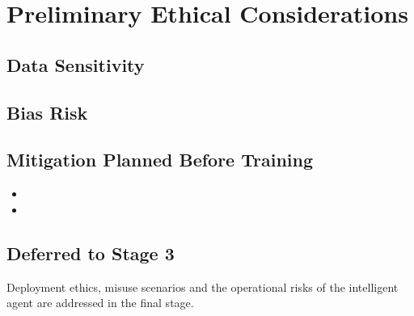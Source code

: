 \section{Preliminary Ethical Considerations}
\label{sec:ethics}

\subsection{Data Sensitivity}

\subsection{Bias Risk}

\subsection{Mitigation Planned Before Training}
\begin{itemize}
  \item {}
  \item {}
\end{itemize}

\subsection{Deferred to Stage 3}
Deployment ethics, misuse scenarios and the operational risks of the
intelligent agent are addressed in the final stage.